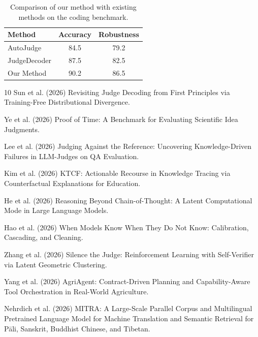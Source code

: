 \begin{titlepage}
\begin{table}[htbp]
\centering
\caption{Comparison of our method with existing methods on the coding benchmark.}
\begin{tabular}{lcc}
\toprule
\textbf{Method} & \textbf{Accuracy} & \textbf{Robustness} \\
\midrule
AutoJudge & 84.5 & 79.2 \\
JudgeDecoder & 87.5 & 82.5 \\
Our Method & 90.2 & 86.5 \\
\bottomrule
\end{tabular}
\label{table:5}
\end{table}

\begin{thebibliography}{10}
Sun et al. (2026) Revisiting Judge Decoding from First Principles via Training-Free Distributional Divergence.

Ye et al. (2026) Proof of Time: A Benchmark for Evaluating Scientific Idea Judgments.

Lee et al. (2026) Judging Against the Reference: Uncovering Knowledge-Driven Failures in LLM-Judges on QA Evaluation.

Kim et al. (2026) KTCF: Actionable Recourse in Knowledge Tracing via Counterfactual Explanations for Education.

He et al. (2026) Reasoning Beyond Chain-of-Thought: A Latent Computational Mode in Large Language Models.

Hao et al. (2026) When Models Know When They Do Not Know: Calibration, Cascading, and Cleaning.

Zhang et al. (2026) Silence the Judge: Reinforcement Learning with Self-Verifier via Latent Geometric Clustering.

Yang et al. (2026) AgriAgent: Contract-Driven Planning and Capability-Aware Tool Orchestration in Real-World Agriculture.

Nehrdich et al. (2026) MITRA: A Large-Scale Parallel Corpus and Multilingual Pretrained Language Model for Machine Translation and Semantic Retrieval for P\=ali, Sanskrit, Buddhist Chinese, and Tibetan.


\end{thebibliography}
\end{titlepage}
